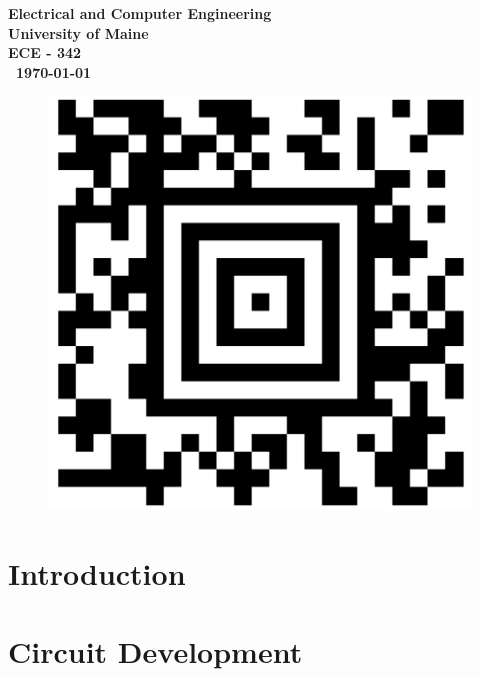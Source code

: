 \documentclass{article}
\begin{document}
\begin{titlepage}
\begin{center}
\begin{abstract}
        

        \end{abstract}
        
        
        \vspace{02.5cm}
        \textbf{
        Electrical and Computer Engineering\\
        University of Maine\\
        ECE - 342\\\ \today}
    \vspace{.5cm}
        \begin{figure}[H]
        \centering
        \includegraphics[scale = 0.1]{Images/barcode.png}
\end{figure}
    \end{center}
\end{titlepage}


\tableofcontents

\newpage

\newpage
\listoffigures
\listoftables
\newpage 
\clearpage




\section{Introduction}

  
 
  \section{Circuit Development}
    
     
\end{document}
